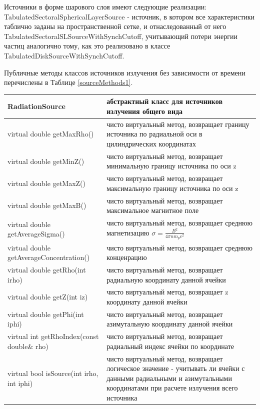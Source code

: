 Источники в форме шарового слоя имеют следующие реализации: TabulatedSectoralSphericalLayerSource - источник, в котором все характеристики таблично заданы на пространственной сетке, и отнаследованный от него TabulatedSectoralSLSourceWithSynchCutoff, учитывающий потери энергии частиц аналогично тому, как это реализовано в классе TabulatedDiskSourceWithSynchCutoff.

Публичные методы классов источников излучения без зависимости от времени перечислены в Таблице \ref{sourceMethods1}.

\begin{small}
	\label{sourceMethods1}
	\begin{xtabular}{|p{0.5\textwidth}|p{0.5\textwidth}|}
		\hline
		\textbf{RadiationSource} & абстрактный класс для источников излучения общего вида\\
		\hline
		virtual double getMaxRho() & чисто виртуальный метод, возвращает границу источника по радиальной оси в цилиндрических координатах\\
		\hline
		virtual double getMinZ() & чисто виртуальный метод, возвращает минимальную границу источника по оси z\\
		\hline
		virtual double getMaxZ() & чисто виртуальный метод, возвращает максимальную границу источника по оси z\\
		\hline
		virtual double getMaxB() & чисто виртуальный метод, возвращает максимальное магнитное поле\\
		\hline
		virtual double getAverageSigma() & чисто виртуальный метод, возвращает среднюю магнетизацию $\sigma=\frac{B^2}{4\pi n m_p c^2}$\\
		\hline
		virtual double getAverageConcentration() &чисто виртуальный метод, возвращает среднюю конценрацию\\
		\hline
		virtual double getRho(int irho) & чисто виртуальный метод, возвращает радиальную координату данной ячейки\\
		\hline
		virtual double getZ(int iz)& чисто виртуальный метод, возвращает z координату данной ячейки\\
		\hline
		virtual double getPhi(int iphi)& чисто виртуальный метод, возвращает азимутальную координату данной ячейки\\
		\hline
		virtual int getRhoIndex(const double\& rho)& чисто виртуальный метод, возвращает радиальный индекс ячейки по координате\\
		\hline
		virtual bool isSource(int irho, int iphi)& чисто виртуальный метод, возвращает логическое значение - учитывать ли ячейки с данными радиальными и азимутальными координатами при расчете излучения всего источника\\

\end{xtabular}
\end{small}
